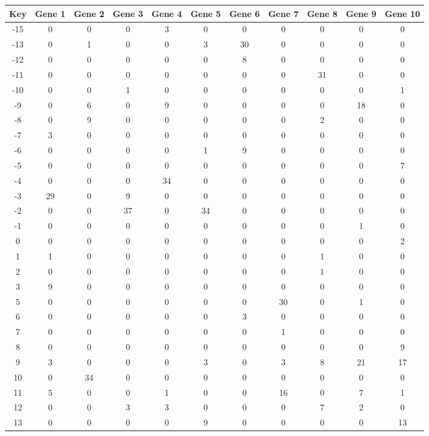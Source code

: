 \begin{tabular}{|c|c|c|c|c|c|c|c|c|c|c|}
\hline
Key & Gene 1 & Gene 2 & Gene 3 & Gene 4 & Gene 5 & Gene 6 & Gene 7 & Gene 8 & Gene 9 & Gene 10 \\
\hline
-15 & 0 & 0 & 0 & 3 & 0 & 0 & 0 & 0 & 0 & 0 \\
-13 & 0 & 1 & 0 & 0 & 3 & 30 & 0 & 0 & 0 & 0 \\
-12 & 0 & 0 & 0 & 0 & 0 & 8 & 0 & 0 & 0 & 0 \\
-11 & 0 & 0 & 0 & 0 & 0 & 0 & 0 & 31 & 0 & 0 \\
-10 & 0 & 0 & 1 & 0 & 0 & 0 & 0 & 0 & 0 & 1 \\
-9 & 0 & 6 & 0 & 9 & 0 & 0 & 0 & 0 & 18 & 0 \\
-8 & 0 & 9 & 0 & 0 & 0 & 0 & 0 & 2 & 0 & 0 \\
-7 & 3 & 0 & 0 & 0 & 0 & 0 & 0 & 0 & 0 & 0 \\
-6 & 0 & 0 & 0 & 0 & 1 & 9 & 0 & 0 & 0 & 0 \\
-5 & 0 & 0 & 0 & 0 & 0 & 0 & 0 & 0 & 0 & 7 \\
-4 & 0 & 0 & 0 & 34 & 0 & 0 & 0 & 0 & 0 & 0 \\
-3 & 29 & 0 & 9 & 0 & 0 & 0 & 0 & 0 & 0 & 0 \\
-2 & 0 & 0 & 37 & 0 & 34 & 0 & 0 & 0 & 0 & 0 \\
-1 & 0 & 0 & 0 & 0 & 0 & 0 & 0 & 0 & 1 & 0 \\
0 & 0 & 0 & 0 & 0 & 0 & 0 & 0 & 0 & 0 & 2 \\
1 & 1 & 0 & 0 & 0 & 0 & 0 & 0 & 1 & 0 & 0 \\
2 & 0 & 0 & 0 & 0 & 0 & 0 & 0 & 1 & 0 & 0 \\
3 & 9 & 0 & 0 & 0 & 0 & 0 & 0 & 0 & 0 & 0 \\
5 & 0 & 0 & 0 & 0 & 0 & 0 & 30 & 0 & 1 & 0 \\
6 & 0 & 0 & 0 & 0 & 0 & 3 & 0 & 0 & 0 & 0 \\
7 & 0 & 0 & 0 & 0 & 0 & 0 & 1 & 0 & 0 & 0 \\
8 & 0 & 0 & 0 & 0 & 0 & 0 & 0 & 0 & 0 & 9 \\
9 & 3 & 0 & 0 & 0 & 3 & 0 & 3 & 8 & 21 & 17 \\
10 & 0 & 34 & 0 & 0 & 0 & 0 & 0 & 0 & 0 & 0 \\
11 & 5 & 0 & 0 & 1 & 0 & 0 & 16 & 0 & 7 & 1 \\
12 & 0 & 0 & 3 & 3 & 0 & 0 & 0 & 7 & 2 & 0 \\
13 & 0 & 0 & 0 & 0 & 9 & 0 & 0 & 0 & 0 & 13 \\
\hline
\end{tabular}